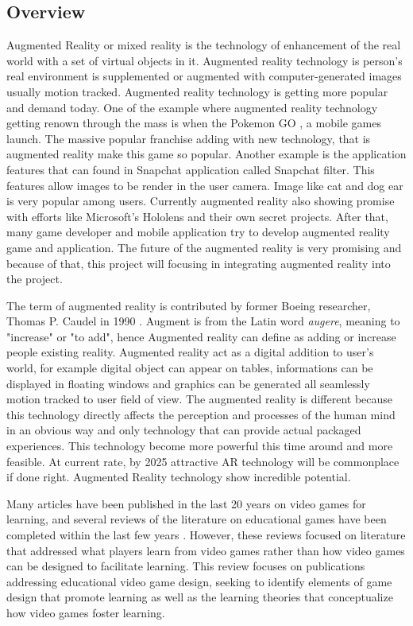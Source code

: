 \documentclass[12pt]{article}
\begin{document}
\subsection{Overview}
Augmented Reality or mixed reality is the technology of enhancement of the real world with a set of virtual objects in it. Augmented reality technology is person's real environment is supplemented or augmented with computer-generated images usually motion tracked. Augmented reality technology is getting more popular and demand today. One of the example where augmented reality technology getting renown through the mass is when  the Pokemon GO \cite{PokemonGo}, a mobile games launch. The massive popular franchise adding with new technology, that is augmented reality make this game so popular. Another example is the application features that can found in Snapchat application called Snapchat filter. This features allow images to be render in the user camera. Image like cat and dog ear is very popular among users. Currently augmented reality also showing promise with efforts like Microsoft's Hololens and their own secret projects. After that, many game developer and mobile application try to develop augmented reality game and application. The future of the augmented reality is very promising and because of that, this project will focusing in integrating augmented reality into the project. 

\par 

The term of augmented reality is contributed by former Boeing researcher, Thomas P. Caudel in 1990 \cite{lee2012augmented}. Augment is from the Latin word \textit{augere}, meaning to "increase" or "to add", hence Augmented reality can define as adding or increase people existing reality. Augmented reality act as a digital addition to user's world, for example digital object can appear on tables, informations can be displayed in floating windows and graphics can be generated all seamlessly motion tracked to user field of view. The augmented reality is different because this technology directly affects the perception and processes of the human mind in an obvious way and only technology that can provide actual packaged experiences. This technology become more powerful this time around and more feasible. At current rate, by 2025 attractive AR technology will be commonplace if done right. Augmented Reality technology show incredible potential.

\par

Many articles have been published in the last 20 years on video games for learning, and several reviews of the literature on educational games have been completed within the last few years . However, these reviews focused on literature that addressed what players learn from video games rather than how video games can be designed to facilitate learning. This review focuses on publications addressing educational video game design, seeking to identify elements of game design that promote learning as well as the learning theories that conceptualize how video games foster learning.
\end{document}
